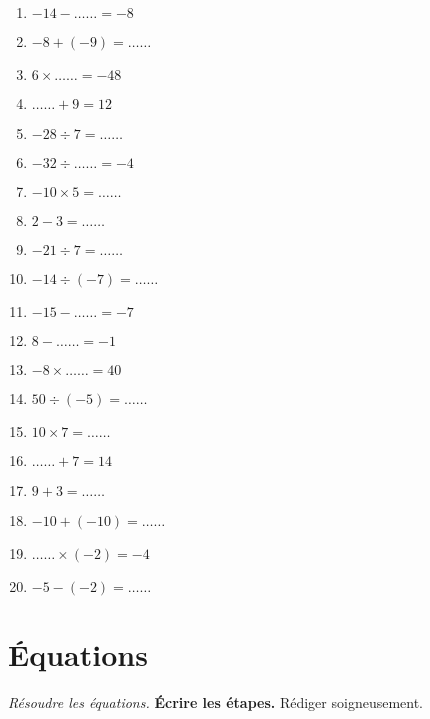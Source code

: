 \documentclass[12pt]{article}
\begin{document}
\begin{multicols}{3}\noindent
    \begin{enumerate}
    \item $-14 - \ldots\ldots = -8$
    \item $-8 + \left( -9\right) = \ldots\ldots$
    \item $6 \times \ldots\ldots = -48$
    \item $\ldots\ldots + 9 = 12$
    \item $-28 \div 7 = \ldots\ldots$
    \item $-32 \div \ldots\ldots = -4$
    \item $-10 \times 5 = \ldots\ldots$
    \item $2 - 3 = \ldots\ldots$
    \item $-21 \div 7 = \ldots\ldots$
    \item $-14 \div \left( -7\right) = \ldots\ldots$
    \item $-15 - \ldots\ldots = -7$
    \item $8 - \ldots\ldots = -1$
    \item $-8 \times \ldots\ldots = 40$
    \item $50 \div \left( -5\right) = \ldots\ldots$
    \item $10 \times 7 = \ldots\ldots$
    \item $\ldots\ldots + 7 = 14$
    \item $9 + 3 = \ldots\ldots$
    \item $-10 + \left( -10\right) = \ldots\ldots$
    \item $\ldots\ldots \times \left( -2\right) = -4$
    \item $-5 - \left( -2\right) = \ldots\ldots$
    \end{enumerate}
  \end{multicols}

    \section*{Équations}
  \textit{Résoudre les équations.} \textbf{Écrire les étapes.} Rédiger soigneusement.
\end{document}
